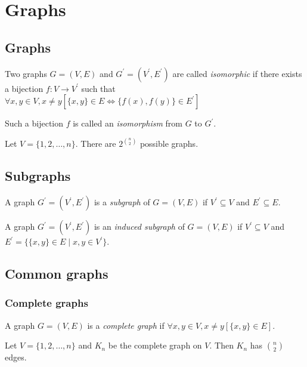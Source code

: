 \documentclass{classnotes}
\begin{document}
\section{Graphs}
\subsection{Graphs}
\begin{definition}[Isomorhpism]
    Two graphs $G=(V,E)$ and $G^\prime = (V^\prime,E^\prime)$ are called \emph{isomorphic} if there exists a bijection $f: V \to V^\prime$ such that
    $\forall x,y \in V, x \ne y [\{x,y\} \in E \iff \{f(x),f(y)\} \in E^\prime]$

    Such a bijection $f$ is called an \emph{isomorphism} from $G$ to $G^\prime$.
\end{definition}

\begin{theorem}
    Let $V=\{1,2,\dots,n\}$. There are $2^{\binom{n}{2}}$ possible graphs.
\end{theorem}

\subsection{Subgraphs}
\begin{definition}[Subgraph]
    A graph $G^\prime = (V^\prime,E^\prime)$ is a \emph{subgraph} of $G=(V,E)$ if $V^\prime \subseteq V$ and $E^\prime \subseteq E$.
\end{definition}

\begin{definition}
    A graph $G^\prime = (V^\prime,E^\prime)$ is an \emph{induced subgraph} of $G=(V,E)$ if $V^\prime \subseteq V$ and $E^\prime = \{\{x,y\} \in E \mid x,y \in V^\prime\}$.
\end{definition}

\subsection{Common graphs}
\subsubsection*{Complete graphs}
\begin{definition}
    A graph $G=(V,E)$ is a \emph{complete graph} if $\forall x,y \in V, x \ne y [\{x,y\} \in E]$.
\end{definition}
\begin{proposition}
    Let $V = \{1,2,\dots,n\}$ and $K_n$ be the complete graph on $V$. Then $K_n$ has $\binom{n}{2}$ edges.
\end{proposition}
\end{document}

